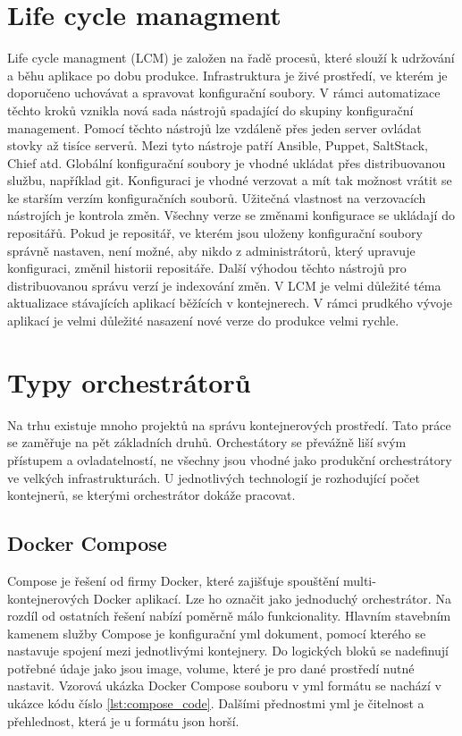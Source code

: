\section{Life cycle managment}
Life cycle managment (LCM) je založen na řadě procesů, které slouží  k udržování a běhu aplikace po dobu produkce. Infrastruktura je živé prostředí, ve kterém je doporučeno uchovávat a spravovat konfigurační soubory.
V rámci automatizace těchto kroků vznikla nová sada nástrojů spadající do skupiny konfigurační management. Pomocí těchto nástrojů lze vzdáleně přes jeden server ovládat stovky až tisíce serverů. Mezi tyto nástroje patří Ansible, Puppet, SaltStack, Chief atd.
Globální konfigurační soubory je vhodné ukládat přes distribuovanou službu, například git. Konfiguraci je  vhodné verzovat a mít tak možnost vrátit se ke starším verzím konfiguračních souborů. Užitečná vlastnost na verzovacích nástrojích je kontrola změn. Všechny verze se změnami konfigurace se ukládají do repositářů. Pokud je repositář, ve kterém jsou uloženy konfigurační soubory správně nastaven, není možné, aby nikdo z administrátorů, který upravuje konfiguraci, změnil historii repositáře. Další výhodou těchto nástrojů pro distribuovanou správu verzí je indexování změn.
V LCM je velmi důležité téma aktualizace stávajících aplikací běžících v kontejnerech. V rámci prudkého vývoje aplikací je velmi důležité nasazení nové verze do produkce velmi rychle. 

\section{Typy orchestrátorů}
Na trhu existuje mnoho projektů na správu kontejnerových prostředí. Tato práce se zaměřuje na pět základních druhů. Orchestátory se převážně liší svým přístupem a ovladatelností, ne všechny jsou vhodné jako produkční orchestrátory ve velkých infrastrukturách. U jednotlivých technologií je rozhodující počet kontejnerů, se kterými orchestrátor dokáže pracovat.

\subsection{Docker Compose}
Compose je řešení od firmy Docker, které zajišťuje spouštění multi-kontejnerových Docker aplikací. Lze ho označit jako jednoduchý orchestrátor. Na rozdíl od ostatních řešení nabízí poměrně málo funkcionality. Hlavním stavebním kamenem služby Compose je konfigurační yml dokument, pomocí kterého se nastavuje spojení mezi jednotlivými kontejnery. Do logických bloků se nadefinují potřebné údaje jako jsou image, volume, které je pro dané prostředí nutné nastavit. Vzorová ukázka Docker Compose souboru v yml formátu se nachází v ukázce kódu číslo \ref{lst:compose_code}.  Dalšími přednostmi yml je čitelnost a přehlednost, která je u formátu json  horší. 

